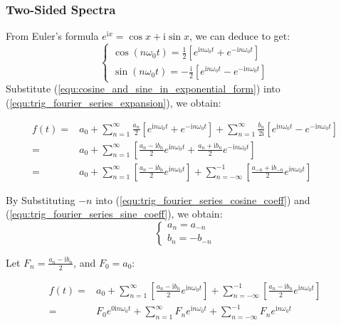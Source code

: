 \documentclass[12pt]{article}
\begin{document}
\subsubsection{Two-Sided Spectra}
From Euler's formula $e^{\mathrm{i}x}=\cos{x}+\mathrm{i}\sin{x}$, we can deduce to get:
\begin{equation}
    \begin{cases}
        \cos(n\omega_0t) = \frac{1}{2}\left[e^{\mathrm{i}n\omega_0t}+e^{-\mathrm{i}n\omega_0t}\right]   \\
        \sin(n\omega_0t) = -\frac{\mathrm{i}}{2}\left[e^{\mathrm{i}n\omega_0t}-e^{-\mathrm{i}n\omega_0t}\right]
    \end{cases}
    \label{equ:cosine_and_sine_in_exponential_form}
\end{equation}
Substitute ({\ref{equ:cosine_and_sine_in_exponential_form}}) into ({\ref{equ:trig_fourier_series_expansion}}), 
we obtain:

$$\begin{aligned} f(t) =& a_0 + 
\sum_{n=1}^{\infty}\frac{a_n}{2}\left[e^{\mathrm{i}n\omega_0t}+e^{-\mathrm{i}n\omega_0t}\right]
+ \sum_{n=1}^{\infty}\frac{b_n}{2\mathrm{i}}\left[e^{\mathrm{i}n\omega_0t}-e^{-\mathrm{i}n\omega_0t}\right] \\
=& a_0 + \sum_{n=1}^{\infty}\left[ \frac{a_n-\mathrm{i}b_n}{2}e^{\mathrm{i}n\omega_0t} 
+ \frac{a_n+\mathrm{i}b_n}{2}e^{-\mathrm{i}n\omega_0t}\right]   \\
=& a_0 + \sum_{n=1}^{\infty}\left[ \frac{a_n-\mathrm{i}b_n}{2}e^{\mathrm{i}n\omega_0t} \right]
+ \sum_{n=-\infty}^{-1}\left[\frac{a_{-n}+\mathrm{i}b_{-n}}{2}e^{\mathrm{i}n\omega_0t}\right]
\end{aligned}$$

By Substituting $-n$ into (\ref{equ:trig_fourier_series_cosine_coeff}) and 
(\ref{equ:trig_fourier_series_sine_coeff}), we obtain:
\begin{equation}\begin{cases}
    a_n = a_{-n}    \\
    b_n = -b_{-n}
\end{cases}
\label{equ:coeff_of_negative_n_relationship}
\end{equation}

Let $F_n=\frac{a_n-\mathrm{i}b_n}{2}$, and $F_0=a_0$:

$$\begin{aligned} f(t) =& a_0 + 
    \sum_{n=1}^{\infty}\left[ \frac{a_n-\mathrm{i}b_n}{2}e^{\mathrm{i}n\omega_0t} \right]
    + \sum_{n=-\infty}^{-1}\left[\frac{a_n-\mathrm{i}b_n}{2}e^{\mathrm{i}n\omega_0t}\right] \\
    =& F_0e^{0\mathrm{i}n\omega_0t} + 
    \sum_{n=1}^{\infty}F_ne^{\mathrm{i}n\omega_0t}
    + \sum_{n=-\infty}^{-1}F_ne^{\mathrm{i}n\omega_0t}
\end{aligned}$$
\end{document}
